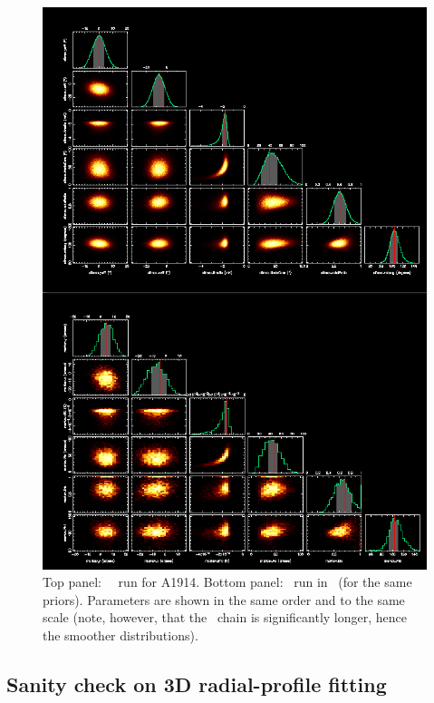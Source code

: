 \newpage
\begin{figure}[mh]
\begin{center}
\includegraphics[scale=0.45]{figures/climax_markov_comp.png}
\end{center}
\caption{Top panel: \climax\ \betamodel\ run for A1914.  Bottom panel:
  \betamodel\ run in \markov\ (for the same priors).  Parameters are
  shown in the same order and to the same scale (note, however, that the
  \climax\ chain is significantly longer, hence the smoother distributions).}
\label{fig:fig1}
\end{figure}

\newpage
\subsection{Sanity check on 3D radial-profile fitting}


